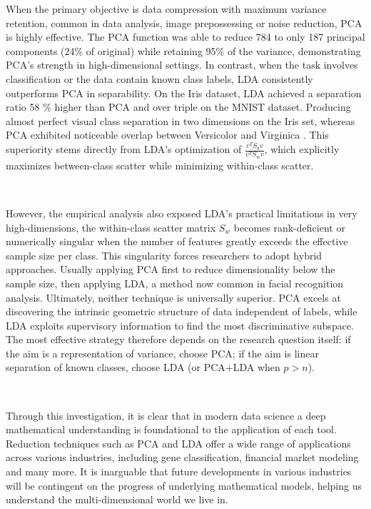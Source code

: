\documentclass{article}
\begin{document}
When the primary objective is data compression with maximum variance retention, common in data analysis, image prepossessing or noise reduction, PCA is highly effective. The PCA function was able to reduce 784 to only 187 principal components (24\% of original) while retaining 95\% of the variance, 
demonstrating PCA’s strength in high-dimensional settings. In contrast, when the task involves classification or the data contain known class labels, LDA consistently outperforms PCA in separability. On the Iris dataset, LDA achieved a separation ratio 58 \% higher than PCA and over triple on the MNIST dataset. Producing almost perfect visual class separation in two dimensions on the Iris set, whereas PCA exhibited noticeable overlap between Versicolor and Virginica . This superiority stems directly from LDA’s optimization of $\frac{v^T S_b v}{v^T S_w v}$, which explicitly maximizes between-class scatter while minimizing within-class scatter.

\

However, the empirical analysis also exposed LDA’s practical limitations in very high-dimensions, the within-class scatter matrix $S_w$ becomes rank-deficient or numerically singular when the number of features greatly exceeds the effective sample size per class. This singularity forces researchers to adopt hybrid approaches. Usually applying PCA first to reduce dimensionality below the sample size, then applying LDA, a method now common in facial recognition analysis. Ultimately, neither technique is universally superior. PCA excels at discovering the intrinsic geometric structure of data independent of labels, while LDA exploits supervisory information to find the most discriminative subspace. The most effective strategy therefore depends on the research question itself: if the aim is a representation of variance, choose PCA; if the aim is linear separation of known classes, choose LDA (or PCA+LDA when $p > n$).

\

Through this investigation, it is clear that in modern data science a deep mathematical understanding is foundational to the application of each tool. Reduction techniques such as PCA and LDA offer a wide range of applications across various industries, including gene classification, financial market modeling and many more. It is inarguable that future developments in various industries will be contingent on the progress of underlying mathematical models, helping us understand the multi-dimensional world we live in.
\end{document}
